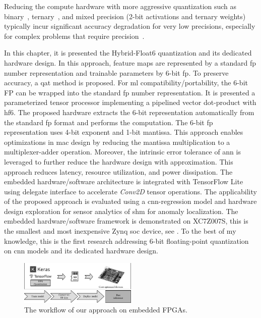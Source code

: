 Reducing the compute hardware with more aggressive quantization such as binary~\cite{courbariaux2015binaryconnect}, ternary~\cite{lin2015neural}, and mixed precision (2-bit activations and ternary weights)~\cite{colangelo2018exploration} typically incur significant accuracy degradation for very low precisions, especially for complex problems that require precision~\cite{faraone2019addnet}.

In this chapter, it is presented the Hybrid-Float6 quantization and its dedicated hardware design. In this approach, feature maps are represented by a standard \gls{fp} number representation and trainable parameters by 6-bit \gls{fp}. To preserve accuracy, a \gls{qat} method is proposed. For \gls{ml} compatibility/portability, the 6-bit FP can be wrapped into the standard \gls{fp} number representation. It is presented a parameterized tensor processor implementing a pipelined vector dot-product with \gls{hf6}. The proposed hardware extracts the 6-bit representation automatically from the standard \gls{fp} format and performs the computation. The 6-bit \gls{fp} representation uses 4-bit exponent and 1-bit mantissa. This approach enables optimizations in \gls{mac} design by reducing the mantissa multiplication to a multiplexer-adder operation. Moreover, the intrinsic error tolerance of \gls{ann} is leveraged to further reduce the hardware design with approximation. This approach reduces latency, resource utilization, and power dissipation. The embedded hardware/software architecture is integrated with TensorFlow Lite using delegate interface to accelerate \emph{Conv2D} tensor operations. The applicability of the proposed approach is evaluated using a \gls{cnn}-regression model and hardware design exploration for sensor analytics of \gls{shm} for anomaly localization. The embedded hardware/software framework is demonstrated on XC7Z007S, this is the smallest and most inexpensive Zynq \gls{soc} device, see . To the best of my knowledge, this is the first research addressing 6-bit floating-point quantization on \gls{cnn} models and its dedicated hardware design.

\begin{figure}[t!]
	\centering
	\includegraphics[width=0.5\textwidth]{./chapters/cnn_accelerator/figures/workflow.pdf}
	\caption{The workflow of our approach on embedded FPGAs.}
	\label{fig:workflow}
\end{figure}

